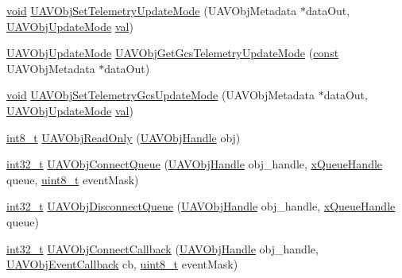 \begin{DoxyCompactItemize}
\item 
\hyperlink{group___n_a_m_e_ga18028b8badbf1ea7e704ccac3c488e82}{void} \hyperlink{group___u_a_v_ga9edfd59a9f2d5c394e10732ee9665549}{U\-A\-V\-Obj\-Set\-Telemetry\-Update\-Mode} (U\-A\-V\-Obj\-Metadata $\ast$data\-Out, \hyperlink{group___u_a_v_gafd571f69747daf7681eb869270e27208}{U\-A\-V\-Obj\-Update\-Mode} \hyperlink{group___p_i_o_s___t_i_m_ga757344f09097232d715d55cbf9d61a43}{val})
\item 
\hyperlink{group___u_a_v_gafd571f69747daf7681eb869270e27208}{U\-A\-V\-Obj\-Update\-Mode} \hyperlink{group___u_a_v_ga38d9b193772855b9ba80bcac9deaf889}{U\-A\-V\-Obj\-Get\-Gcs\-Telemetry\-Update\-Mode} (\hyperlink{group___n_a_m_e_ga7ae6d0e43244213b34de2c2b9aa30da6}{const} U\-A\-V\-Obj\-Metadata $\ast$data\-Out)
\item 
\hyperlink{group___n_a_m_e_ga18028b8badbf1ea7e704ccac3c488e82}{void} \hyperlink{group___u_a_v_gad8be93b4fe3024c3770607938edf0337}{U\-A\-V\-Obj\-Set\-Telemetry\-Gcs\-Update\-Mode} (U\-A\-V\-Obj\-Metadata $\ast$data\-Out, \hyperlink{group___u_a_v_gafd571f69747daf7681eb869270e27208}{U\-A\-V\-Obj\-Update\-Mode} \hyperlink{group___p_i_o_s___t_i_m_ga757344f09097232d715d55cbf9d61a43}{val})
\item 
\hyperlink{stdint_8h_ad566f6541e98b74246db1a3a3a85ad49}{int8\-\_\-t} \hyperlink{group___u_a_v_ga3cc68c222007383c1da3240d48e58fa9}{U\-A\-V\-Obj\-Read\-Only} (\hyperlink{group___n_a_m_e_gac31715ab50a1903838e7d87c8022ec75}{U\-A\-V\-Obj\-Handle} obj)
\item 
\hyperlink{group___n_a_m_e_gafd12020da5a235dfcf0c3c748fb5baed}{int32\-\_\-t} \hyperlink{group___u_a_v_ga0ee2030a00c48317b268e82dac8be146}{U\-A\-V\-Obj\-Connect\-Queue} (\hyperlink{group___n_a_m_e_gac31715ab50a1903838e7d87c8022ec75}{U\-A\-V\-Obj\-Handle} obj\-\_\-handle, \hyperlink{_common_2_libraries_2_free_r_t_o_s_2_source_2include_2queue_8h_a229037f755b756156e34a440ce134b8b}{x\-Queue\-Handle} queue, \hyperlink{stdint_8h_aba7bc1797add20fe3efdf37ced1182c5}{uint8\-\_\-t} event\-Mask)
\item 
\hyperlink{group___n_a_m_e_gafd12020da5a235dfcf0c3c748fb5baed}{int32\-\_\-t} \hyperlink{group___u_a_v_ga42fd51da437a13e22879d922fd771070}{U\-A\-V\-Obj\-Disconnect\-Queue} (\hyperlink{group___n_a_m_e_gac31715ab50a1903838e7d87c8022ec75}{U\-A\-V\-Obj\-Handle} obj\-\_\-handle, \hyperlink{_common_2_libraries_2_free_r_t_o_s_2_source_2include_2queue_8h_a229037f755b756156e34a440ce134b8b}{x\-Queue\-Handle} queue)
\item 
\hyperlink{group___n_a_m_e_gafd12020da5a235dfcf0c3c748fb5baed}{int32\-\_\-t} \hyperlink{group___u_a_v_gaf37f8752f1cde59a9b77d9ed7709c365}{U\-A\-V\-Obj\-Connect\-Callback} (\hyperlink{group___n_a_m_e_gac31715ab50a1903838e7d87c8022ec75}{U\-A\-V\-Obj\-Handle} obj\-\_\-handle, \hyperlink{group___u_a_v_ga33d11560e38b56dc904220fb0f785c28}{U\-A\-V\-Obj\-Event\-Callback} cb, \hyperlink{stdint_8h_aba7bc1797add20fe3efdf37ced1182c5}{uint8\-\_\-t} event\-Mask)

\end{DoxyCompactItemize}
